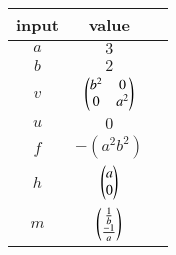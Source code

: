 \begin{tabular}[10pt]{ |c| c| c|}
    \hline
    \textbf{input} & \textbf{value}\\
    \hline 
    $a$&$3$\\
    \hline
    $b$&$2$\\
    \hline
    $v$&$\begin{pmatrix}b^2&0\\0&a^2\end{pmatrix}$\\
    \hline 
    $u$&$0$\\
    \hline 
    $f$&$-(a^2b^2)$\\
    \hline
    $h$&$\begin{pmatrix}a\\0\end{pmatrix}$\\
    \hline
    $m$&$\begin{pmatrix}\frac{1}{b}\\\frac{-1}{a}\end{pmatrix}$\\
    \hline
    \end{tabular}
